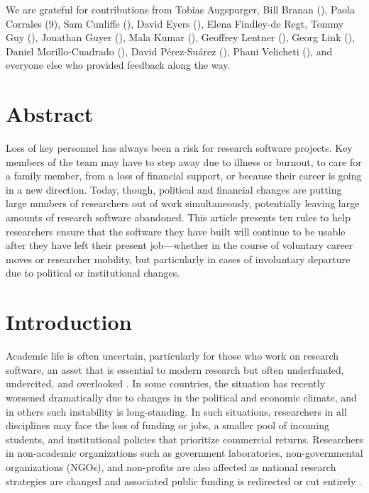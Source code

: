 \documentclass[10pt,letterpaper]{article}
\begin{document}
\noindent
We are grateful for contributions from
Tobias Augspurger,
Bill Branan (),
Paola Corrales (9),
Sam Cunliffe (),
David Eyers (),
Elena Findley-de Regt,
Tommy Guy (),
Jonathan Guyer (),
Mala Kumar (),
Geoffrey Lentner (),
Georg Link (),
Daniel Morillo-Cuadrado (),
David Pérez-Suárez (),
Phani Velicheti (),
and everyone else who provided feedback along the way.

\section*{Abstract}

Loss of key personnel has always been a risk for research software projects.
Key members of the team may have to step away due to illness or burnout,
to care for a family member,
from a loss of financial support,
or because their career is going in a new direction.
Today,
though,
political and financial changes are putting large numbers of researchers out of work simultaneously,
potentially leaving large amounts of research software abandoned.
This article presents ten rules to help researchers ensure that
the software they have built will continue to be usable
after they have left their present job---whether in the course of voluntary career moves or researcher mobility,
but particularly in cases of involuntary departure due to political or institutional changes.

\linenumbers

\section*{Introduction}

Academic life is often uncertain,
particularly for those who work on research software,
an asset that is essential to modern research \cite{Pearson2025}
but often underfunded, undercited, and overlooked \cite{Carver2022}.
In some countries, the situation has recently worsened dramatically due to changes in the political and economic climate,
and in others such instability is long-standing.
In such situations, researchers in all disciplines may face the loss of funding or jobs,
a smaller pool of incoming students,
and institutional policies that prioritize commercial returns.
Researchers in non-academic organizations
such as government laboratories, non-governmental organizations (NGOs), and non-profits are also affected \cite{Woodward2025}
as national research strategies are changed
and associated public funding is redirected or cut entirely \cite{Nature2019,Nature2021,Nature2023,RatRisk2024,Nature2025}.
\end{document}
